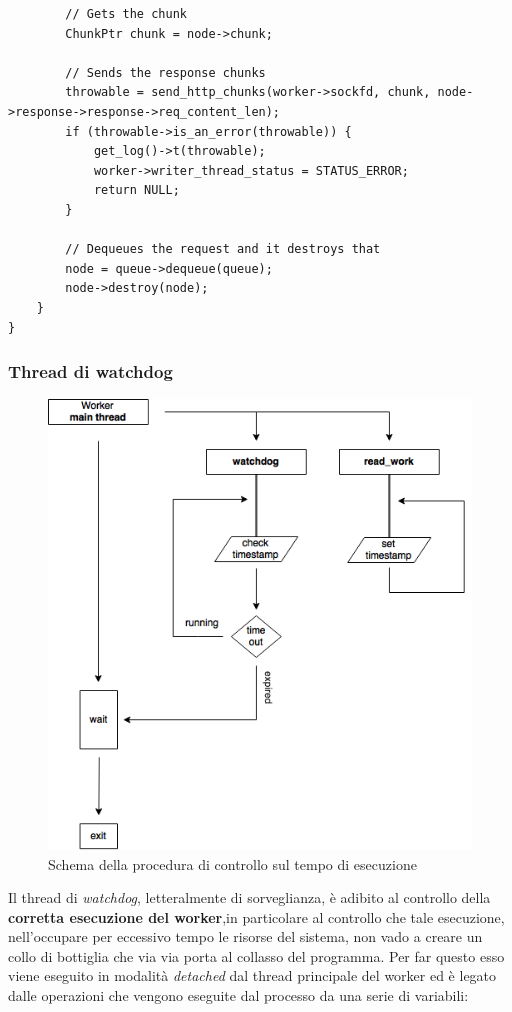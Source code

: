 \documentclass[italian]{tktltiki2}
\begin{document}
\begin{lstlisting}
        // Gets the chunk
        ChunkPtr chunk = node->chunk;

        // Sends the response chunks
        throwable = send_http_chunks(worker->sockfd, chunk, node->response->response->req_content_len);
        if (throwable->is_an_error(throwable)) {
            get_log()->t(throwable);
            worker->writer_thread_status = STATUS_ERROR;
            return NULL;
        }

        // Dequeues the request and it destroys that
        node = queue->dequeue(queue);
        node->destroy(node);
    }
}
\end{lstlisting}
\subsubsection{Thread di watchdog}
\label{sec:watchdog}
\begin{figure}[h]
\centering
\includegraphics[width=\textwidth]{images/watchdog}
\caption{Schema della procedura di controllo sul tempo di esecuzione \label{fig: watchdog}}
\end{figure}
Il thread di \emph{watchdog}, letteralmente di sorveglianza, è adibito al controllo della \textbf{corretta esecuzione del worker},in particolare al controllo che tale esecuzione, nell'occupare per eccessivo tempo le risorse del sistema, non vado a creare un collo di bottiglia che via via porta al collasso del programma. Per far questo esso viene eseguito in modalità \emph{detached} dal thread principale del worker ed è legato dalle operazioni che vengono eseguite dal processo da una serie di variabili: 
\end{document}
